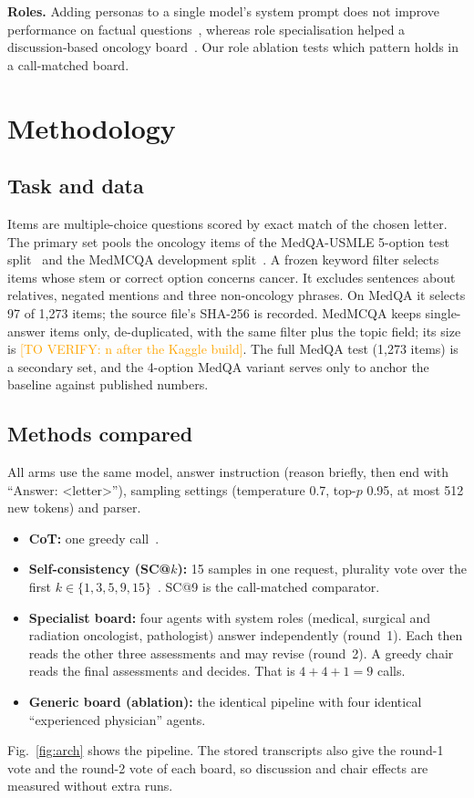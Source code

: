 \IfFileExists{IEEEtran.cls}{\documentclass[conference]{IEEEtran}}{\documentclass[10pt,twocolumn]{article}\usepackage[margin=0.75in]{geometry}}
\newcommand{\toverify}[1]{\textcolor{orange}{[TO VERIFY: #1]}}
\begin{document}
\textbf{Roles.} Adding personas to a single model's system prompt does not improve performance on factual questions~\cite{zheng2024personas}, whereas role specialisation helped a discussion-based oncology board~\cite{kim2025mlhc}. Our role ablation tests which pattern holds in a call-matched board.

\section{Methodology}
\subsection{Task and data}
Items are multiple-choice questions scored by exact match of the chosen letter. The primary set pools the oncology items of the MedQA-USMLE 5-option test split~\cite{jin2021medqa} and the MedMCQA development split~\cite{pal2022medmcqa}. A frozen keyword filter selects items whose stem or correct option concerns cancer. It excludes sentences about relatives, negated mentions and three non-oncology phrases. On MedQA it selects 97 of 1{,}273 items; the source file's SHA-256 is recorded. MedMCQA keeps single-answer items only, de-duplicated, with the same filter plus the topic field; its size is \toverify{n after the Kaggle build}. The full MedQA test (1{,}273 items) is a secondary set, and the 4-option MedQA variant serves only to anchor the baseline against published numbers.

\subsection{Methods compared}
All arms use the same model, answer instruction (reason briefly, then end with ``Answer: \textless letter\textgreater''), sampling settings (temperature 0.7, top-$p$ 0.95, at most 512 new tokens) and parser.
\begin{itemize}
\item \textbf{CoT:} one greedy call~\cite{kojima2022zeroshot}.
\item \textbf{Self-consistency (SC@$k$):} 15 samples in one request, plurality vote over the first $k\in\{1,3,5,9,15\}$~\cite{wang2023selfconsistency}. SC@9 is the call-matched comparator.
\item \textbf{Specialist board:} four agents with system roles (medical, surgical and radiation oncologist, pathologist) answer independently (round~1). Each then reads the other three assessments and may revise (round~2). A greedy chair reads the final assessments and decides. That is $4+4+1=9$ calls.
\item \textbf{Generic board (ablation):} the identical pipeline with four identical ``experienced physician'' agents.
\end{itemize}
Fig.~\ref{fig:arch} shows the pipeline. The stored transcripts also give the round-1 vote and the round-2 vote of each board, so discussion and chair effects are measured without extra runs.
\end{document}
